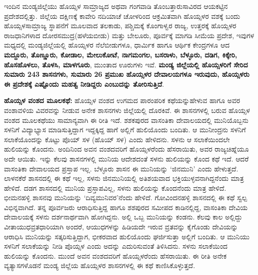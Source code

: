 ಇಂದಿನ ಮಂಡ್ಯಜಿಲ್ಲೆಯು ಹೊಯ್ಸಳ ಸಾಮ್ರಾಜ್ಯದ ಅಥವಾ ಗಂಗವಾಡಿ ತೊಂಬತ್ತಾರುಸಾವಿರದ ಆಯಕಟ್ಟಿನ ಪ್ರದೇಶದಲ್ಲಿತ್ತು. ಜಿಲ್ಲೆಯ ದಕ್ಷಿಣಕ್ಕೆ ಕಾವೇರಿ ನದಿಯಾಚೆ ಚೋಳರಿಂದ ಆಕ್ರಮಿತವಾಗಿ ಹೊಯ್ಸಳರ ವಶಕ್ಕೆ ಬಂದು ಹೊಯ್ಸಳಸಾಮ್ರಾಜ್ಯ ಸ್ಥಾಪನೆಗೆ ಮೂಲವಾದ ತಲಕಾಡು, ಪಶ್ಚಿಮಕ್ಕೆ ಕೊಂಗಾಳ್ವರ ರಾಜ್ಯ, ಉತ್ತರಕ್ಕೆ ಹೊಯ್ಸಳರ ರಾಜಧಾನಿಗಳಾದ ದೋರಸಮುದ್ರ\break (ಹಳೆಯಬೀಡು) ಮತ್ತು ಬೇಲೂರು, ಪೂರ್ವಕ್ಕೆ ಮಾಗಡಿ ಸೀಮೆಯ ಪ್ರದೇಶ, ಇವುಗಳ ಮಧ್ಯದಲ್ಲಿ ಮಂಡ್ಯಜಿಲ್ಲೆಯಲ್ಲಿ ಹೊಯ್ಸಳರ ನೆಲೆಬೀಡುಗಳೂ, ಧಾರ್ಮಿಕ ಹಾಗೂ ಆರ್ಥಿಕ ಕೇಂದ್ರಗಳೂ ಆದ \textbf{ಮದ್ದೂರು, ತೊಣ್ಣೂರು, ಕೋಡಾಲ, ಮೇಲುಕೋಟೆ, ನಾಗಮಂಗಲ, ಬಸರಾಳು, ಬೆಳ್ಳೂರು, ದಡಿಗ, ಕಿಕ್ಕೇರಿ, ಹೊಸಹೊಳಲು, ತೊಳಸಿ, ಮಾಳಗೂರು}, ಮುಂತಾದ ಊರುಗಳು ಇವೆ. \textbf{ಮಂಡ್ಯ ಜಿಲ್ಲೆಯಲ್ಲಿ ಹೊಯ್ಸಳರಿಗೆ ಸೇರಿದ ಸುಮಾರು 243 ಶಾಸನಗಳು, ಸುಮಾರು 26 ಪ್ರಮುಖ ಹೊಯ್ಸಳರ ದೇವಾಲಯಗಳೂ ಇರುವುದು, ಹೊಯ್ಸಳರು ಈ ಪ್ರದೇಶಕ್ಕೆ ಎಷ್ಟೊಂದು ಮಹತ್ವ ನೀಡಿದ್ದರು ಎಂಬುದನ್ನು ತೋರಿಸುತ್ತಿದೆ}.

\textbf{ಹೊಯ್ಸಳ ವಂಶದ ಮೂಲಕಥೆ: } ಹೊಯ್ಸಳ ವಂಶದ ಉಗಮದ ಪಾರಂಪರಿಕ ಕಥೆಯನ್ನುಹೇಳುವ ಹಾಗೂ ಅವರ ವಂಶಾವಳಿಯ ವಿವರವನ್ನು ನೀಡುವ ಅನೇಕ ಶಾಸನಗಳು ಜಿಲ್ಲೆಯಲ್ಲಿ ದೊರಕಿವೆ. ಈ ಶಾಸನಗಳಲ್ಲಿ ಬರುವ ಹೊಯ್ಸಳ ವಂಶದ ಮೂಲಕಥೆಯು ಸಾಮಾನ್ಯವಾಗಿ ಈ ರೀತಿ ಇದೆ. ಶಶಕಪುರದ ವಾಸಂತಿಕಾ ದೇವಾಲಯದಲ್ಲಿ ಮುನಿಯೊಬ್ಬನು ಸಳನಿಗೆ ವಿದ್ಯಾಭ್ಯಾಸ ಮಾಡಿಸುತ್ತಿದ್ದಾಗ ಇದ್ದಕ್ಕಿದ್ದ ಹಾಗೆ ಅಲ್ಲಿಗೆ ಹುಲಿಯೊಂದು ಬಂದಿತು. ಆ ಮುನೀಂದ್ರನು ಸಳನಿಗೆ ಸಲಾಕೆಯೊಂದನ್ನು ಕೊಟ್ಟು ಪೊಯ್​ ಸಳ (ಹೊಯ್​ ಸಳ) ಎಂದು ಹೇಳಿದನು. ಸಳನು ಆ ಸಲಾಕೆಯಿಂದಲೇ ಹುಲಿಯನ್ನು ಕೊಂದನು. ಅಂದಿನಿಂದ ಅವನ ವಂಶದವರಿಗೆ ಹೊಯ್ಸಳರೆಂದು ಹೆಸರಾಯಿತು, ಅವರ ರಾಜ್ಯಚಿಹ್ನೆಯೂ ಅದೇ ಆಯಿತು. ಇನ್ನು ಕೆಲವು ಶಾಸನಗಳಲ್ಲಿ ಮುನಿಯ ಆದೇಶದಂತೆ ಸಳನು ಹುಲಿಯನ್ನು ಕೊಂದ ಕಥೆ ಇದೆ. ಆದರೆ ವಾಸಂತಿಕಾ ದೇವಾಲಯದ ಪ್ರಸ್ತಾಪ ಇಲ್ಲ. ಬೆಳ್ಳೂರು ಶಾಸನ ಈ ಮುನಿಯನ್ನು ‘ಜಿನಮುನಿ’ ಎಂದು ಹೇಳುತ್ತದೆ. ಲಾಳನಕೆರೆ ಶಾಸನದಲ್ಲಿ ಈ ಕಥೆ ಇಲ್ಲ, ಸಳನು ಜಿನಮುನಿಯಲ್ಲಿ ಅತಿಶಯವಾದ ಭಕ್ತಿಯುಳ್ಳವನಾಗಿದ್ದನೆಂದು ಮಾತ್ರ ಹೇಳಿದೆ. ದಡಗ ಶಾಸನದಲ್ಲಿ ಮುನಿಯ ಪ್ರಸ್ತಾಪವಿಲ್ಲ, ಸಳನು ಹುಲಿಯನ್ನು ಕೊಂದನೆಂದು ಮಾತ್ರ ಹೇಳಿದೆ. ಭೀಮನಹಳ್ಳಿ ಶಾಸನವು ಮುನಿಯನ್ನು ‘ದಿವ್ಯಮುನಿವರ’ನೆಂದು ಹೇಳಿದೆ. ಗೋವಿಂದನಹಳ್ಳಿ ಶಾಸನದಲ್ಲಿ ಈ ಕಥೆ ಸ್ವಲ್ಪ ವಿಭಿನ್ನವಾಗಿದೆ. ತನ್ನ ಪೂರ್ವಜರು ಆರಾಧಿಸುತ್ತಿದ್ದ ಹಾಗೂ ಶಶಪುರದ ಸಮೀಪದ ಕಾಡಿನಲ್ಲಿದ್ದ, ವಾಸಂತಿಕಾ ದೇವಿಯ ದೇವಾಲಯಕ್ಕೆ ಸಳನು ದರ್ಶನಾರ್ಥವಾಗಿ ಹೋಗಿದ್ದನು. ಅಲ್ಲಿ ಒಬ್ಬ ಮುನಿಯನ್ನು ಕಂಡನು. ಕೆಲವು ಕಾಲ ಅಲ್ಲಿದ್ದು ವೀತಾಯುಧವ್ರತಧಾರಿಯಾಗಿ ಅಂದರೆ, ಆಯುಧಗಳನ್ನು ಹಿಡಿಯದೇ ಇರುವ ವ್ರತವನ್ನು ಕೈಗೊಂಡು ದೇವಿಯನ್ನು ಆರಾಧಿಸಿ ಮುನಿಯನ್ನು ಸತ್ಕರಿಸುತ್ತಿದ್ದಾಗ, ಭೀಕರವಾದ ಹುಲಿಯೊಂದು ಘರ್ಜಿಸುತ್ತಾ ಅಲ್ಲಿಗೆ ಬಂದಿತು. ಆ ಮುನಿಯು ಸಳನಿಗೆ ಸಲಾಕೆಯನ್ನು ನೀಡಿ ಪೊಯ್ಸಳ ಎಂದು ಅದನ್ನು ಎದುರಿಸುವಂತೆ ತಿಳಿಸಿದನು. ಸಳನು ಸಲಾಕೆಯಿಂದ ಹುಲಿಯನ್ನು ಕೊಂದನು. ಮುಂದೆ ಅವನ ವಂಶದವರಿಗೆ ಹೊಯ್ಸಳರೆಂದು ಹೆಸರಾಯಿತು. ಈ ರೀತಿ ಅನೇಕ ವ್ಯತ್ಯಾಸಗಳೊಡನೆ ಮಂಡ್ಯ ಜಿಲ್ಲೆಯ ಹೊಯ್ಸಳರ ಶಾಸನಗಳಲ್ಲಿ ಈ ಕಥೆ ಕಾಣಿಸಿಕೊಳ್ಳುತ್ತದೆ.

